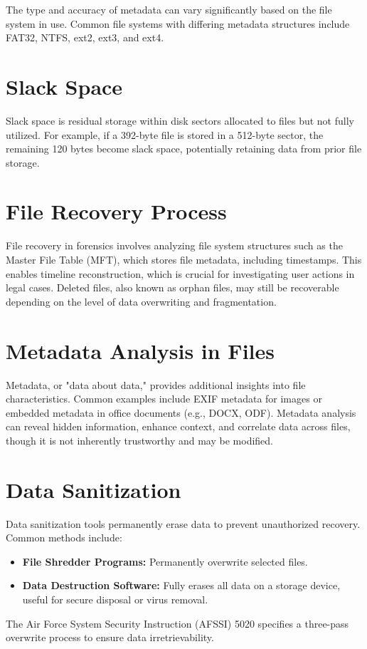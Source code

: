 The type and accuracy of metadata can vary significantly based on the file system in use. Common file systems with differing metadata structures include FAT32, NTFS, ext2, ext3, and ext4.

\section{Slack Space}

Slack space is residual storage within disk sectors allocated to files but not fully utilized. For example, if a 392-byte file is stored in a 512-byte sector, the remaining 120 bytes become slack space, potentially retaining data from prior file storage.

\section{File Recovery Process}

File recovery in forensics involves analyzing file system structures such as the Master File Table (MFT), which stores file metadata, including timestamps. This enables timeline reconstruction, which is crucial for investigating user actions in legal cases. Deleted files, also known as orphan files, may still be recoverable depending on the level of data overwriting and fragmentation.

\section{Metadata Analysis in Files}

Metadata, or "data about data," provides additional insights into file characteristics. Common examples include EXIF metadata for images or embedded metadata in office documents (e.g., DOCX, ODF). Metadata analysis can reveal hidden information, enhance context, and correlate data across files, though it is not inherently trustworthy and may be modified.

\section{Data Sanitization}

Data sanitization tools permanently erase data to prevent unauthorized recovery. Common methods include:
\begin{itemize}
    \item \textbf{File Shredder Programs:} Permanently overwrite selected files.
    \item \textbf{Data Destruction Software:} Fully erases all data on a storage device, useful for secure disposal or virus removal.
\end{itemize}

The Air Force System Security Instruction (AFSSI) 5020 specifies a three-pass overwrite process to ensure data irretrievability.

